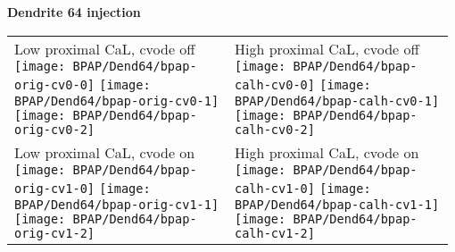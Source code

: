 \documentclass{article}
\begin{document}
\pagebreak[4]

\begin{center}
  \textbf{Dendrite 64 injection}
\end{center}

\begin{tabular}{@{}p{0.49\linewidth}p{0.49\linewidth}@{}}
  Low proximal CaL, cvode off
  \texttt{[image: BPAP/Dend64/bpap-orig-cv0-0]}
  \texttt{[image: BPAP/Dend64/bpap-orig-cv0-1]}
  \texttt{[image: BPAP/Dend64/bpap-orig-cv0-2]} 
  &
  High proximal CaL, cvode off
  \texttt{[image: BPAP/Dend64/bpap-calh-cv0-0]}
  \texttt{[image: BPAP/Dend64/bpap-calh-cv0-1]}
  \texttt{[image: BPAP/Dend64/bpap-calh-cv0-2]} 
  \\
  Low proximal CaL, cvode on
  \texttt{[image: BPAP/Dend64/bpap-orig-cv1-0]}
  \texttt{[image: BPAP/Dend64/bpap-orig-cv1-1]}
  \texttt{[image: BPAP/Dend64/bpap-orig-cv1-2]} 
  &
  High proximal CaL, cvode on
  \texttt{[image: BPAP/Dend64/bpap-calh-cv1-0]}
  \texttt{[image: BPAP/Dend64/bpap-calh-cv1-1]}
  \texttt{[image: BPAP/Dend64/bpap-calh-cv1-2]} 
\end{tabular}
\end{document}
